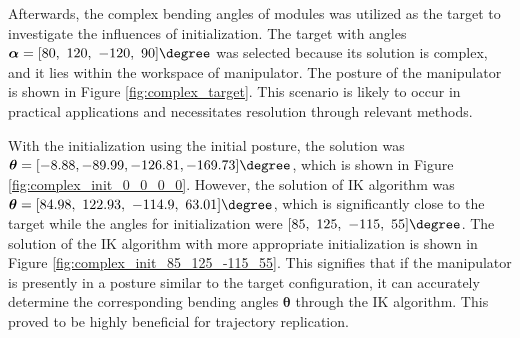 Afterwards, the complex bending angles of modules was utilized as the target to investigate the influences of initialization. 
The target with angles $\boldsymbol{\alpha} = [80,\ 120,\ -120,\ 90]\degree$ was selected because its solution is complex, 
and it lies within the workspace of manipulator. The posture of the manipulator is shown in Figure 
\ref{fig:complex_target}. This scenario is likely to occur in practical applications and necessitates resolution 
through relevant methods. 

With the initialization using the initial posture, the solution was 
$\boldsymbol{\theta} = [-8.88, -89.99, -126.81, -169.73]\degree$, which is shown in Figure \ref{fig:complex_init_0_0_0_0}. 
However, the solution of IK algorithm was $\boldsymbol{\theta} = [84.98,\ 122.93,\ -114.9,\ 63.01]\degree$, 
which is significantly close to the target while the angles for initialization were $[85,\ 125,\ -115,\ 55]\degree$. 
The solution of the IK algorithm with more appropriate initialization is shown in Figure 
\ref{fig:complex_init_85_125_-115_55}. This signifies that if the manipulator is presently in a posture similar 
to the target configuration, it can accurately determine the corresponding bending angles $\boldsymbol{\theta}$ through the 
IK algorithm. This proved to be highly beneficial for trajectory replication. 
